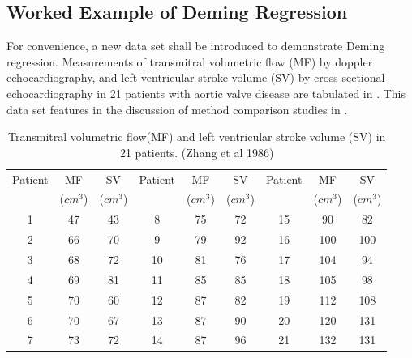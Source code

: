 \documentclass[12pt, a4paper]{report}
\theoremstyle{plain}
\theoremstyle{definition}
\theoremstyle{remark}
\begin{document}



\subsection{Worked Example of Deming Regression}
For convenience, a new data set shall be introduced to demonstrate
Deming regression. Measurements of transmitral volumetric flow
(MF) by doppler echocardiography, and left ventricular stroke
volume (SV) by cross sectional echocardiography in 21 patients
with aortic valve disease are tabulated in \citet{zhang}. This
data set features in the discussion of method comparison studies
in \citet[p.398]{AltmanBook}.


\begin{table}[h!]
	\begin{center}
		\begin{tabular}{|c|c|c||c|c|c||c|c|c|}
			\hline
			Patient & MF  & SV  & Patient & MF  & SV  & Patient & MF  & SV \\
			&($cm^{3}$)&  ($cm^{3}$) & &($cm^{3}$)&  ($cm^{3}$) & &($cm^{3}$)&  ($cm^{3}$)
			\\
			\hline
			1 & 47 & 43 &  8 & 75 & 72 &  15 & 90 & 82 \\
			2 & 66 & 70 & 9 & 79 & 92 &  16 & 100 & 100 \\
			3 & 68 & 72 & 10 & 81 & 76 & 17 & 104 & 94 \\
			4 & 69 & 81 & 11 & 85 & 85 &  18 & 105 & 98 \\
			5 & 70 & 60 & 12 & 87 & 82 & 19 & 112 & 108 \\
			6 & 70 & 67 & 13 & 87 & 90 & 20 & 120 & 131 \\
			7 & 73 & 72 & 14 & 87 & 96 &  21 & 132 & 131 \\
			
			\hline
		\end{tabular}
		\caption{Transmitral volumetric flow(MF) and left ventricular
			stroke volume (SV) in 21 patients. (Zhang et al 1986)}
	\end{center}
\end{table}
\end{document}
